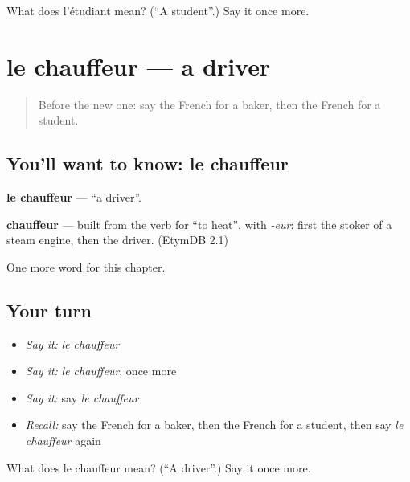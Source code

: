 \begin{tcolorbox}[breakable,colback=teal!4,colframe=teal!35!black,title={Before you move on}]
What does l'étudiant mean? (\textquotedblleft{}A student\textquotedblright{}.) Say it once more.
\end{tcolorbox}
\section[le chauffeur]{le chauffeur — a driver}

\label{lesson:FR-C124-chauffeur}



\begin{quote}
Before the new one: say the French for a baker, then the French for a student.
\end{quote}

\subsection*{You'll want to know: le chauffeur}
\textbf{le chauffeur} — \textquotedblleft{}a driver\textquotedblright{}.

\begin{cousinweb}
\textbf{chauffeur} — built from the verb for \textquotedblleft{}to heat\textquotedblright{}, with \emph{-eur}: first the stoker of a steam engine, then the driver. (EtymDB 2.1)
\end{cousinweb}

\begin{grammarlens}[title={What you've built}]
One more word for this chapter.
\end{grammarlens}

\subsection*{Your turn}
\begin{itemize}
\raggedright
  \item \emph{Say it:} \emph{le chauffeur}
  \item \emph{Say it:} \emph{le chauffeur}, once more
  \item \emph{Say it:} say \emph{le chauffeur}
  \item \emph{Recall:} say the French for a baker, then the French for a student, then say \emph{le chauffeur} again
\end{itemize}

\begin{tcolorbox}[breakable,colback=teal!4,colframe=teal!35!black,title={Before you move on}]
What does le chauffeur mean? (\textquotedblleft{}A driver\textquotedblright{}.) Say it once more.
\end{tcolorbox}

